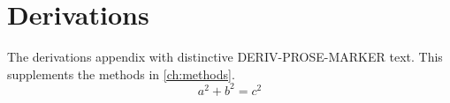 \chapter{Derivations}\label{app:deriv}
The derivations appendix with distinctive DERIV-PROSE-MARKER text.
This supplements the methods in \cref{ch:methods}.
\begin{equation}\label{eq:deriv}
a^2 + b^2 = c^2
\end{equation}
